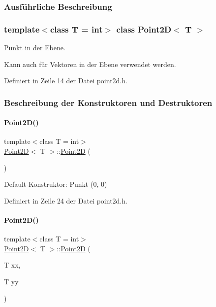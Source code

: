 \subsubsection{Ausführliche Beschreibung}
\subsubsection*{template$<$class T = int$>$\newline
class Point2\+D$<$ T $>$}

Punkt in der Ebene. 

Kann auch für Vektoren in der Ebene verwendet werden. 

Definiert in Zeile 14 der Datei point2d.\+h.



\subsubsection{Beschreibung der Konstruktoren und Destruktoren}
\mbox{\label{classPoint2D_aee9a754c77f7d10e637348db18dc537c}} 
\paragraph{\texorpdfstring{Point2\+D()}{Point2D()}\hspace{0.1cm}{\footnotesize\ttfamily [1/3]}}
{\footnotesize\ttfamily template$<$class T = int$>$ \\
\mbox{\hyperlink{classPoint2D}{Point2D}}$<$ T $>$\+::\mbox{\hyperlink{classPoint2D}{Point2D}} (\begin{DoxyParamCaption}{ }\end{DoxyParamCaption})\hspace{0.3cm}{\ttfamily [inline]}}



Default-\/\+Konstruktor\+: Punkt (0, 0) 



Definiert in Zeile 24 der Datei point2d.\+h.

\mbox{\label{classPoint2D_aa0bdade25949f97757b579587443da87}} 
\paragraph{\texorpdfstring{Point2\+D()}{Point2D()}\hspace{0.1cm}{\footnotesize\ttfamily [2/3]}}
{\footnotesize\ttfamily template$<$class T = int$>$ \\
\mbox{\hyperlink{classPoint2D}{Point2D}}$<$ T $>$\+::\mbox{\hyperlink{classPoint2D}{Point2D}} (\begin{DoxyParamCaption}\item[{T}]{xx,  }\item[{T}]{yy }\end{DoxyParamCaption})\hspace{0.3cm}{\ttfamily [inline]}}



